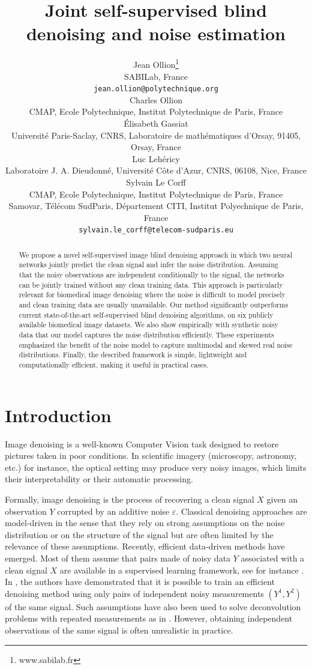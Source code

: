 \documentclass{article}
\title{Joint self-supervised blind denoising and noise estimation}
\author{%
  Jean Ollion\thanks{www.sabilab.fr}\\
  SABILab, France\\
  \texttt{jean.ollion@polytechnique.org} \\
  \And
  Charles Ollion\\
  CMAP, Ecole Polytechnique, Institut Polytechnique de Paris, France\\
  \And
  \'Elisabeth Gassiat\\
  Universit\'e Paris-Saclay, CNRS, Laboratoire de math\'ematiques d'Orsay, 91405, Orsay, France\\
  \And
  Luc Leh\'ericy\\
  Laboratoire J. A. Dieudonn\'e, Universit\'e C\^ote d'Azur, CNRS, 06108, Nice, France\\
  \And
  Sylvain Le Corff \\
  CMAP, Ecole Polytechnique, Institut Polytechnique de Paris, France\\
  Samovar, T\'el\'ecom SudParis, D\'epartement CITI, Institut Polyechnique de Paris, France\\
  \texttt{sylvain.le_corff@telecom-sudparis.eu} \\
}
\begin{document}
\maketitle

\begin{abstract}
We propose a novel self-supervised image blind denoising approach in which two neural networks jointly predict the clean signal and infer the noise distribution.
Assuming that the noisy observations are independent conditionally to the signal, the networks can be jointly trained without any clean training data. This approach is particularly relevant for biomedical image denoising where the noise is difficult to model precisely and clean training data are usually unavailable. Our method significantly outperforms current state-of-the-art self-supervised blind denoising algorithms, on six publicly available biomedical image datasets. We also show empirically with synthetic noisy data that our model captures the noise distribution efficiently. These experiments  emphasized the benefit of the noise model to capture multimodal and skewed real noise distributions. Finally, the described framework is simple, lightweight and computationally efficient, making it useful in practical cases.
\end{abstract}

\section{Introduction}
\label{sec:introduction}

Image denoising is a well-known Computer Vision task designed to restore pictures taken in poor conditions. In scientific imagery (microscopy, astronomy, etc.) for instance,  the optical setting may produce very noisy images, which limits their interpretability or their automatic processing.

Formally, image denoising is the process of recovering a clean signal $X$ given an observation $Y$ corrupted by an additive noise $\varepsilon$. Classical denoising approaches are model-driven in the sense that they rely on strong assumptions on the noise distribution or on the structure of the signal but are often limited by the relevance of these assumptions.
Recently, efficient data-driven methods have emerged. Most of them assume that pairs made of noisy data $Y$ associated with a clean signal $X$ are available in a supervised learning framework, see for instance \cite{weigert2017content}. In \cite{lehtinen2018noise2noise}, the authors have demonstrated that it is possible to train an efficient denoising method using only pairs of independent noisy measurements $(Y^1, Y^2)$ of the same signal. Such assumptions have also been used to solve deconvolution problems with repeated measurements as in \cite{delaigle2008deconvolution}. However, obtaining independent observations of the same signal is often unrealistic in practice.
\end{document}
